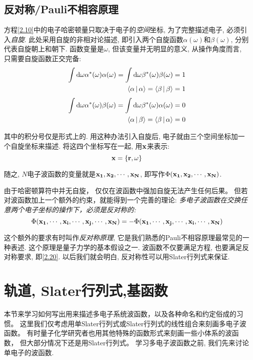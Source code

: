 \subsection{反对称/Pauli不相容原理}
\label{sec2.1.3}
方程\autoref{2.10}中的电子哈密顿量只取决于电子的\emph{空间}坐标, 
为了完整描述电子, 
必须引入\emph{自旋}. 
此处采用自旋的非相对论描述, 
即引入两个自旋函数$\alpha(\omega)$和$\beta(\omega)$, 
分别代表自旋朝上和朝下. 
函数变量是$\omega$, 
但该变量并无明显的意义, 
从操作角度而言, 
只需要自旋函数正交完备:
\begin{subequations}
	\begin{align}
\int\dd\omega\alpha^*(\omega)\alpha(\omega)=\int\dd\omega\beta^*(\omega)\beta(\omega)=1\\
\braket{\alpha|\alpha}=\braket{\beta|\beta}=1
	\end{align}
\end{subequations}
\begin{subequations}
	\begin{align}
	\int\dd\omega\alpha^*(\omega)\beta(\omega)=\int\dd\omega\beta^*(\omega)\alpha(\omega)=0\\
	\braket{\alpha|\beta}=\braket{\beta|\alpha}=0
	\end{align}
\end{subequations}
\label{2.20}

其中的积分号仅是形式上的. 
用这种办法引入自旋后, 
电子就由三个空间坐标加一个自旋坐标来描述. 
将这四个坐标写在一起,
用$\mathbf{x}$来表示:
 \begin{equation}
 \label{2.21}
 \mathbf{x}=\{\mathbf{r},\omega\}
 \end{equation}

 随之, $N$电子波函数的变量就是$ \mathbf{x_1,x_2,\cdots ,x_N} $, 即写作$\Phi(\mathbf{x_1,x_2,\cdots ,x_N})$.
 
由于哈密顿算符中并无自旋，
仅仅在波函数中强加自旋无法产生任何后果。
但若对波函数加上一个额外的约束，就能得到一个完善的理论: 
\emph{
	多电子波函数在交换任意两个电子坐标的操作下，必须是反对称的:
}
\begin{equation}
\label{2.22}
\Phi(\mathbf{x_1,\cdots,x_i,\cdots,x_j,\cdots ,x_N})=-\Phi(\mathbf{x_1,\cdots,x_j,\cdots,x_i,\cdots ,x_N})
\end{equation}

这个额外的要求有时叫作\emph{反对称原理}, 
它是我们熟悉的Pauli不相容原理最常见的一种表述. 
这个原理是量子力学的基本假设之一. 
波函数不仅要满足\sch 方程, 
也要满足反对称要求, 即\autoref{2.20}. 
以后我们就会明白, 反对称性可以用Slater行列式来保证.
 
\section{轨道, Slater行列式,基函数}
\label{sec2.2}
本节来学习如何写出用来描述多电子系统波函数，以及各种命名和约定俗成的习惯。
这里我们仅考虑用单Slater行列式或Slater行列式的线性组合来刻画多电子波函数。
有时量子化学研究者也用其他特殊的函数形式来刻画一些小体系的波函数，
但大部分情况下还是用Slater行列式。
学习多电子波函数之前, 我们先来讨论单电子的波函数.
 
